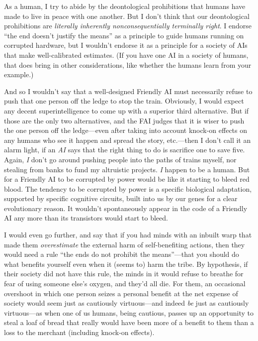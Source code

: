 {
 As a human, I try to abide by the deontological prohibitions that
humans have made to live in peace with one another. But I
don't think that our deontological prohibitions are
\textit{literally inherently nonconsequentially terminally right}. I
endorse ``the end doesn't justify the
means'' as a principle to guide humans running on
corrupted hardware, but I wouldn't endorse it as a
principle for a society of AIs that make well-calibrated estimates. (If
you have one AI in a society of humans, that does bring in other
considerations, like whether the humans learn from your example.)}

{
 And so I wouldn't say that a well-designed
Friendly AI must necessarily refuse to push that one person off the
ledge to stop the train. Obviously, I would expect any decent
superintelligence to come up with a superior third alternative. But if
those are the only two alternatives, and the FAI judges that it is
wiser to push the one person off the ledge---even after taking into
account knock-on effects on any humans who see it happen and spread the
story, etc.---then I don't call it an alarm light, if
an \textit{AI} says that the right thing to do is sacrifice one to save
five. Again, \textit{I} don't go around pushing people
into the paths of trains myself, nor stealing from banks to fund my
altruistic projects. \textit{I} happen to be a human. But for a
Friendly AI to be corrupted by power would be like it starting to bleed
red blood. The tendency to be corrupted by power is a specific
biological adaptation, supported by specific cognitive circuits, built
into us by our genes for a clear evolutionary reason. It
wouldn't spontaneously appear in the code of a Friendly
AI any more than its transistors would start to bleed.}

{
 I would even go further, and say that if you had minds with an
inbuilt warp that made them \textit{overestimate} the external harm of
self-benefiting actions, then they would need a rule
``the ends do not prohibit the
means''---that you should do what benefits yourself
even when it (seems to) harm the tribe. By hypothesis, if their society
did not have this rule, the minds in it would refuse to breathe for
fear of using someone else's oxygen, and
they'd all die. For them, an occasional overshoot in
which one person seizes a personal benefit at the net expense of
society would seem just as cautiously virtuous---and indeed \textit{be}
just as cautiously virtuous---as when one of us humans, being cautious,
passes up an opportunity to steal a loaf of bread that really would
have been more of a benefit to them than a loss to the merchant
(including knock-on effects).}

